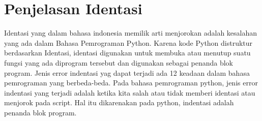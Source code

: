 \chapter*{Penjelasan Identasi}

\par
	Identasi yang dalam bahasa indonesia memilik arti menjorokan adalah kesalahan yang ada dalam Bahasa Pemrograman Python. Karena kode Python distruktur berdasarkan Identasi, identasi digunakan untuk membuka atau menutup suatu fungsi yang ada diprogram tersebut dan digunakan sebagai penanda blok program. Jenis error indentasi yag dapat terjadi ada 12 keadaan dalam bahasa pemrograman yang berbeda-beda. Pada bahasa pemrograman python, jenis error indentasi yang terjadi adalah ketika kita salah atau tidak memberi identasi atau menjorok pada script. Hal itu dikarenakan pada python, indentasi adalah penanda blok program.

		
